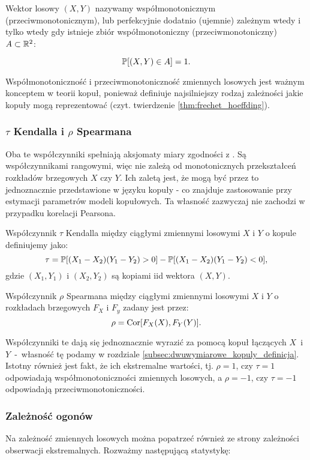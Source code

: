 \begin{df}
	Wektor losowy $(X, Y)$ nazywamy współmonotonicznym (przeciwmonotonicznym), lub perfekcyjnie dodatnio (ujemnie) zależnym wtedy i tylko wtedy gdy istnieje zbiór współmonotoniczny (przeciwmonotoniczny) $A\subset\mathbb{R}^2$:
	
	$$ \mathbb{P}[(X,Y)\in A]=1.$$
\end{df}

Współmonotoniczność i przeciwmonotoniczność zmiennych losowych jest ważnym konceptem w teorii kopuł, ponieważ definiuje najsilniejszy rodzaj zależności jakie kopuły mogą reprezentować (czyt. twierdzenie \ref{thm:frechet_hoeffding}).

\subsubsection{$\tau$ Kendalla i $\rho$ Spearmana}

Oba te współczynniki spełniają aksjomaty miary zgodności z \cite{Scarsini1984}. Są współczynnikami rangowymi, więc nie zależą od monotonicznych przekształceń rozkładów brzegowych $X$ czy $Y$. Ich zaletą jest, że mogą być przez to jednoznacznie przedstawione w języku kopuły - co znajduje zastosowanie przy estymacji parametrów modeli kopułowych. Ta własność zazwyczaj nie zachodzi w przypadku korelacji Pearsona.

\begin{df}
	Współczynnik $\tau$ Kendalla między ciągłymi zmiennymi losowymi $X$ i $Y$ o kopule definiujemy jako:
	$$ \tau = \mathbb{P}[(X_1-X_2)(Y_1-Y_2)>0] - \mathbb{P}[(X_1-X_2)(Y_1-Y_2) <0], $$
	gdzie $(X_1, Y_1)$ i $(X_2, Y_2)$ są kopiami iid wektora $(X, Y)$.
\end{df}

\begin{df}
	Współczynnik $\rho$ Spearmana między ciągłymi zmiennymi losowymi $X$ i $Y$ o rozkładach brzegowych $F_X$ i $F_y$ zadany jest przez:
	$$ \rho = \text{Cor}[F_X(X), F_Y(Y)].$$
\end{df}

Współczynniki te dają się jednoznacznie wyrazić za pomocą kopuł łączących $X$~i~$Y$~-~własność tę podamy w rozdziale \ref{subsec:dwuwymiarowe_kopuly_definicja}. Istotny również jest fakt, że ich ekstremalne wartości, tj. $\rho= 1$, czy $\tau=1$ odpowiadają współmonotoniczności zmiennych losowych, a $\rho=-1$, czy $\tau=-1$ odpowiadają przeciwmonotoniczności.

\subsubsection{Zależność ogonów}
Na zależność zmiennych losowych można popatrzeć również ze strony zależności obserwacji ekstremalnych. Rozważmy następującą statystykę:

